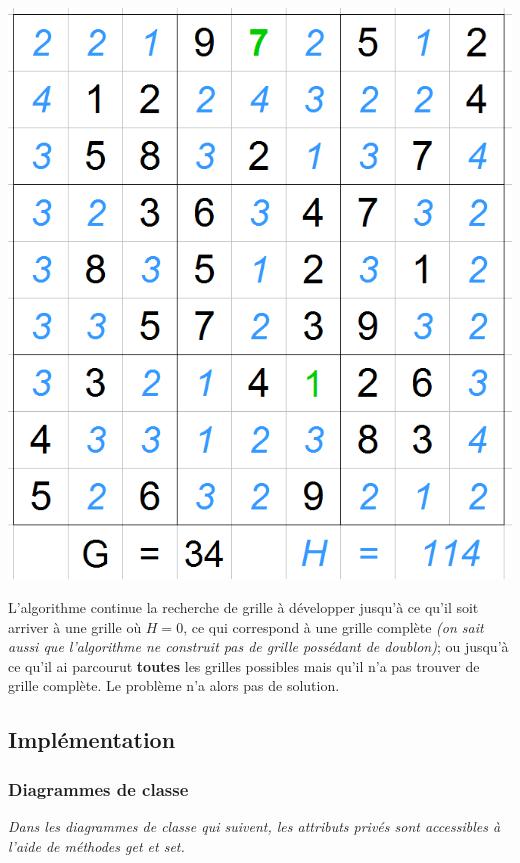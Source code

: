 \begin{center}
\includegraphics[scale=0.3]{images/AStarExample/2.png}
\end{center}


L'algorithme continue la recherche de grille à développer jusqu'à ce qu'il soit arriver à une grille où $H=0$, ce qui correspond à une grille complète \textit{(on sait aussi que l'algorithme ne construit pas de grille possédant de doublon)}; ou jusqu'à ce qu'il ai parcourut \textbf{toutes} les grilles possibles mais qu'il n'a pas trouver de grille complète. Le problème n'a alors pas de solution.



         \subsection{Implémentation}
         
                 
            \subsubsection{Diagrammes de classe}
            
            \textit{Dans les diagrammes de classe qui suivent, les attributs privés sont accessibles à l'aide de méthodes get et set.}
            
